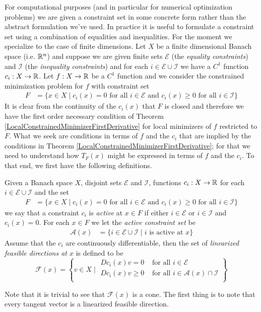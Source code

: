 For computational purposes (and in particular for numerical
optimization problems) we are given a constraint set in some concrete
form rather than the abstract formulation we've used.  In practice it
is useful to formulate a constraint set using a combination of
equalities and inequalities.  For the moment we specialize to the case
of finite dimensions.  Let $X$ be a finite dimensional Banach space
(i.e. $\mathbb{R}^n$) and suppose we are given finite sets $\mathcal{E}$
(the \emph{equality constraints})
and $\mathcal{I}$ (the \emph{inequality constraints}) and for each $i
\in \mathcal{E} \cup \mathcal{I}$ we have a $C^1$ 
function $c_i : X \to \mathbb{R}$.  Let $f : X \to \mathbb{R}$ be a $C^1$
function and we consider the constrained minimization problem for $f$
with constraint set 
\begin{align*}
F &= \lbrace x \in X \mid c_i(x) = 0 \text{ for all $i \in
    \mathcal{E}$ and } c_i(x) \geq 0 \text{ for all $i \in
    \mathcal{I}$} \rbrace
\end{align*}
It is clear from the continuity of the $c_i(x)$ that $F$ is closed and
therefore we have the first order necessary condition of Theorem
\ref{LocalConstrainedMinimizerFirstDerivative} for local minimizers of
$f$ restricted to $F$.  What we seek are
conditions in terms of $f$ and the $c_i$ that are implied by the
conditions in Theorem \ref{LocalConstrainedMinimizerFirstDerivative};
for that we need to understand how $T_F(x)$ might be expressed in
terms of $f$ and the $c_i$.  To that end, we first have the following
definitions.
\begin{defn}Given a Banach space $X$, disjoint sets $\mathcal{E}$ and
  $\mathcal{I}$, functions $c_i : X \to \mathbb{R}$ for each $i \in
  \mathcal{E} \cup \mathcal{I}$ and the set
\begin{align*}
F &= \lbrace x \in X \mid c_i(x) = 0 \text{ for all $i \in
    \mathcal{E}$ and } c_i(x) \geq 0 \text{ for all $i \in
    \mathcal{I}$} \rbrace
\end{align*}
we say that a constraint $c_i$ is \emph{active} at $x \in F$ if either
$i \in \mathcal{E}$ or $i \in \mathcal{I}$ and $c_i(x) = 0$.  For each
$x \in F$ we let the \emph{active constraint set} be 
\begin{align*}
\mathcal{A}(x) &= \lbrace i \in \mathcal{E} \cup \mathcal{I} \mid i
                 \text{ is active at $x$} \rbrace
\end{align*}
Assume that the $c_i$ are continuously differentiable, then the set of \emph{linearized feasible directions at $x$} is defined to
be 
\begin{equation*}
\mathcal{F}(x) =
\left \{ v \in X \mid
\begin{aligned}
Dc_i(x) v = 0 & \text{ for all $i \in \mathcal{E}$} \\
Dc_i(x) v \geq 0 & \text{ for all $i \in \mathcal{A}(x) \cap \mathcal{I}$} \\
\end{aligned}
\right \}
\end{equation*}
\end{defn}
Note that it is trivial to see that $\mathcal{F}(x)$ is a cone.  The
first thing is to note that every tangent vector is a linearized
feasible direction.

